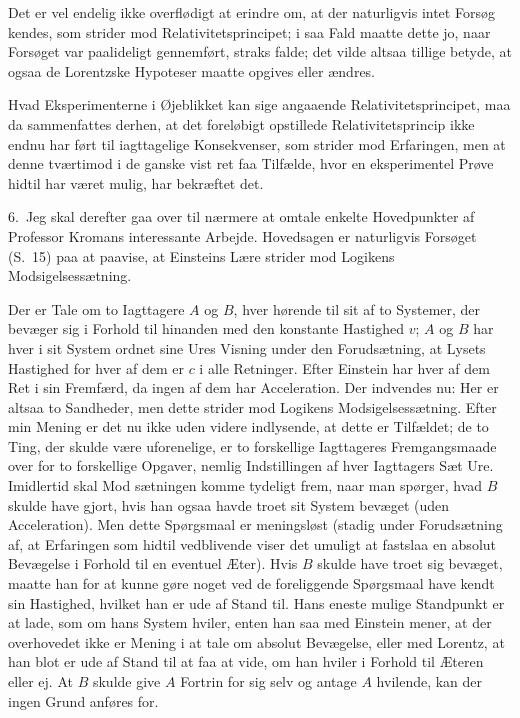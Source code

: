 \documentclass[12pt,a4paper]{article}
\newcommand{\opage}[1]{\marginnote{\footnotesize\textit{[#1]}}}
\begin{document}
Det er vel endelig ikke overflødigt at erindre om, at der naturligvis
intet Forsøg kendes, som strider mod Relativitetsprincipet; i saa Fald
maatte dette jo, naar Forsøget var paalideligt gennemført, straks
falde; det vilde altsaa tillige betyde, at ogsaa de Lorentzske
Hypoteser maatte opgives eller ændres.

Hvad Eksperimenterne i Øjeblikket kan sige angaaende
Relativitetsprincipet, maa da sammenfattes derhen, at det foreløbigt
opstillede Relativitetsprincip ikke endnu har ført til iagttagelige
Konsekvenser, som strider mod Erfaringen, men at denne tværtimod i de
ganske vist ret faa Tilfælde, hvor en eksperimentel Prøve hidtil har
været mulig, har bekræftet det.

6.\ Jeg skal derefter gaa over til nærmere at omtale enkelte
Hovedpunkter af Professor Kromans interessante Arbejde. Hovedsagen er
naturligvis Forsøget (S.~15) paa at paavise, at Einsteins Lære strider
mod Logikens Modsigelsessætning.

Der er Tale om to Iagttagere $A$ og $B$, hver hørende til sit af to
Systemer, der bevæger sig i Forhold til hinanden med den konstante
Hastighed $v$; $A$ og $B$ har hver i sit System ordnet sine Ures
Visning under den Forudsætning, at Lysets Hastighed for hver af dem er
$c$ i alle Retninger. Efter Einstein har hver af dem Ret i sin
Fremfærd, da ingen af dem har Acceleration. Der indvendes nu: Her er
altsaa to Sandheder, men dette strider mod Logikens
Modsigelsessætning. Efter min Mening er det nu ikke uden videre
indlysende, at dette er Tilfældet; de to Ting, der skulde være
uforenelige, er to forskellige Iagttageres Fremgangsmaade over for to
forskellige Opgaver, nemlig Indstillingen af hver Iagttagers Sæt Ure.
Imidlertid skal Mod\-%
\opage{25}%
sætningen komme tydeligt frem, naar man spørger, hvad $B$ skulde have
gjort, hvis han ogsaa havde troet sit System bevæget (uden
Acceleration). Men dette Spørgsmaal er meningsløst (stadig under
Forudsætning af, at Erfaringen som hidtil vedblivende viser det umuligt
at fastslaa en absolut Bevægelse i Forhold til en eventuel Æter). Hvis
$B$ skulde have troet sig bevæget, maatte han for at kunne gøre noget
ved de foreliggende Spørgsmaal have kendt sin Hastighed, hvilket han er
ude af Stand til. Hans eneste mulige Standpunkt er at lade, som om hans
System hviler, enten han saa med Einstein mener, at der overhovedet
ikke er Mening i at tale om absolut Bevægelse, eller med Lorentz, at
han blot er ude af Stand til at faa at vide, om han hviler i Forhold
til Æteren eller ej. At $B$ skulde give $A$ Fortrin for sig selv og
antage $A$ hvilende, kan der ingen Grund anføres for.
\end{document}
